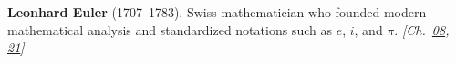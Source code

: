 \textbf{Leonhard Euler} (1707–1783). Swiss mathematician who founded modern mathematical analysis and standardized notations such as $e$, $i$, and $\pi$. \emph{[Ch.~\hyperref[ch:boundedprimegaps]{08}, \hyperref[ch:exponentialmapslietheory]{21}]}


